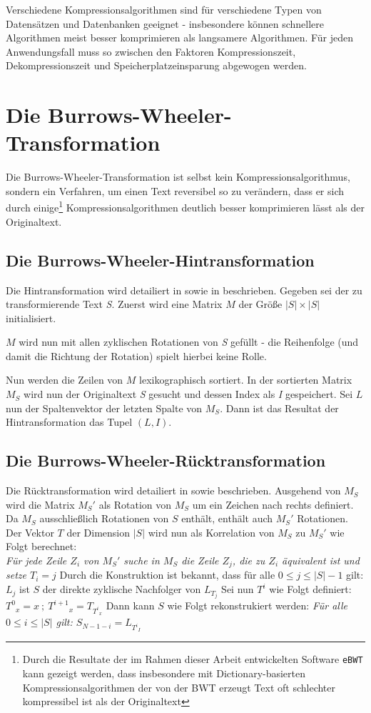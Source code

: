 \documentclass[ngerman,pdftex,paper=A4,DIV=calc,titlepage,12pt]{scrartcl}
\newtheorem[L]{boxedDefinition}{Definition}
\begin{document}
Verschiedene Kompressionsalgorithmen sind für verschiedene Typen von Datensätzen und Datenbanken geeignet - insbesondere können schnellere Algorithmen meist besser komprimieren als langsamere Algorithmen. Für jeden Anwendungsfall muss so zwischen den Faktoren Kompressionszeit, Dekompressionszeit und Speicherplatzeinsparung abgewogen werden.
\section{Die Burrows-Wheeler-Transformation}
Die Burrows-Wheeler-Transformation ist selbst kein Kompressionsalgorithmus, sondern ein Verfahren, um einen Text reversibel so zu verändern, dass er sich durch einige\footnote{Durch die Resultate der im Rahmen dieser Arbeit entwickelten Software \texttt{eBWT} kann gezeigt werden, dass insbesondere mit Dictionary-basierten Kompressionsalgorithmen der von der BWT erzeugt Text oft schlechter kompressibel ist als der Originaltext} Kompressionsalgorithmen deutlich besser komprimieren lässt als der Originaltext.
\subsection{Die Burrows-Wheeler-Hintransformation}\label{ssec:transformation}
Die Hintransformation wird detailiert in \cite{Heun2003} sowie in \cite[Seite 2 - Algorithmus C]{burrows1994block} beschrieben.
Gegeben sei der zu transformierende Text \textit{S}. Zuerst wird eine Matrix $M$ der Größe $|S| \times |S|$ initialisiert.

$M$ wird nun mit allen zyklischen Rotationen von \textit{S} gefüllt - die Reihenfolge (und damit die Richtung der Rotation) spielt hierbei keine Rolle.

Nun werden die Zeilen von $M$ lexikographisch sortiert. In der sortierten Matrix $M_S$ wird nun der Originaltext \textit{S} gesucht und dessen Index als \textit{I} gespeichert. Sei $L$ nun der Spaltenvektor der letzten Spalte von $M_S$. Dann ist das Resultat der Hintransformation das Tupel $(L, I)$.
\subsection{Die Burrows-Wheeler-Rücktransformation}
\label{ssec:backtransformation}
Die Rücktransformation wird detailiert in \cite[Seite 3-5, Algorithmus D]{burrows1994block} sowie \cite{Heun2003} beschrieben.
Ausgehend von $M_S$ wird die Matrix $M_S'$ als Rotation von $M_S$ um ein Zeichen nach rechts definiert. Da $M_S$ ausschließlich Rotationen von $S$ enthält, enthält auch $M_S'$ Rotationen. Der Vektor $T$ der Dimension $|S|$ wird nun als Korrelation von $M_S$ zu $M_S'$ wie Folgt berechnet:\\
\textit{Für jede Zeile $Z_i$ von $M_S'$ suche in $M_S$ die Zeile $Z_j$, die zu $Z_i$ äquivalent ist und setze $T_i = j$}
Durch die Konstruktion ist bekannt, dass für alle $0 \leq j \leq |S|-1$ gilt: $L_j$ ist $S$ der direkte zyklische Nachfolger von $L_{T_j}$
Sei nun $T^i$ wie Folgt definiert: ${T^0}_x = x\ ;\ {T^{i+1}}_x = T_{{T^i}_x}$
Dann kann $S$ wie Folgt rekonstrukiert werden: \textit{Für alle $0 \leq i \leq |S|$ gilt: $S_{N-1-i} = L_{{T^i}_I}$}
\end{document}

